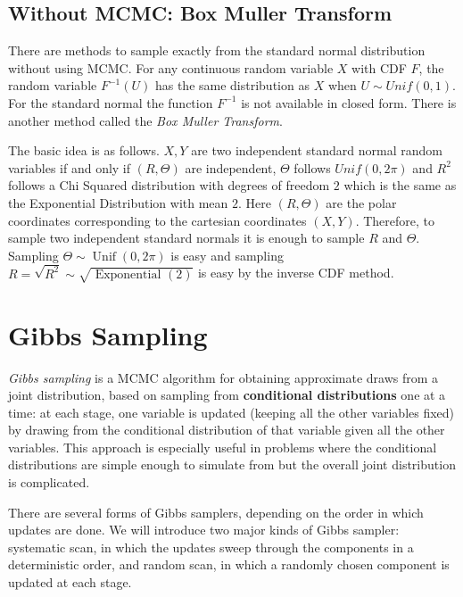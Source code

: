 \documentclass[11pt]{elegantbook}
\begin{document}
\subsection{Without MCMC: Box Muller Transform}
There are methods to sample exactly from the standard normal distribution without using MCMC. For any continuous random variable $X$ with CDF $F$, the random variable $F^{-1}(U)$ has the same distribution as $X$ when $U \sim Unif(0,1)$. For the standard normal the function $F^{-1}$ is not available in closed form. There is another method called the \textit{Box Muller Transform}.

The basic idea is as follows. $X, Y$ are two independent standard normal random variables if and only if $(R, \Theta)$ are independent, $\Theta$ follows $Unif(0,2 \pi)$ and $R^2$ follows a Chi Squared distribution with degrees of freedom $2$ which is the same as the Exponential Distribution with mean $2$. Here $(R, \Theta)$ are the polar coordinates corresponding to the cartesian coordinates $(X, Y)$. Therefore, to sample two independent standard normals it is enough to sample $R$ and $\Theta$. Sampling $\Theta \sim \operatorname{Unif}(0,2 \pi)$ is easy and sampling $R=\sqrt{R^2} \sim \sqrt{\text { Exponential }(2)}$ is easy by the inverse CDF method.

\section{Gibbs Sampling}
\textit{Gibbs sampling} is a MCMC algorithm for obtaining approximate draws from a joint distribution, based on sampling from \textbf{conditional distributions} one at a time: at each stage, one variable is updated (keeping all the other variables fixed) by drawing from the conditional distribution of that variable given all the other variables. This approach is especially useful in problems where the conditional distributions are simple enough to simulate from but the overall joint distribution is complicated.

There are several forms of Gibbs samplers, depending on the order in which updates are done. We will introduce two major kinds of Gibbs sampler: systematic scan, in which the updates sweep through the components in a deterministic order, and random scan, in which a randomly chosen component is updated at each stage.
\end{document}
